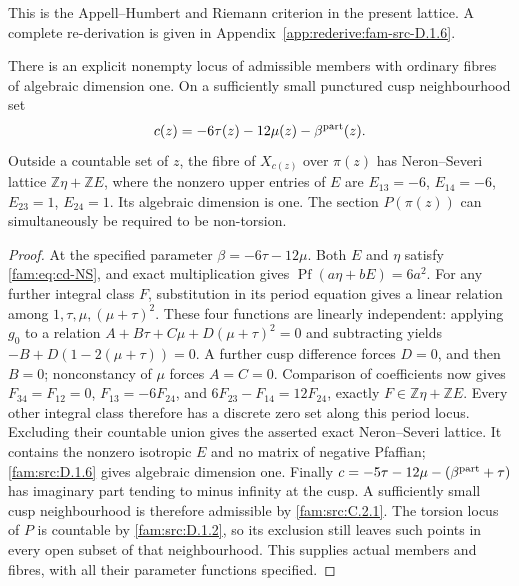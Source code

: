 This is the Appell--Humbert and Riemann criterion in the present lattice. A complete re-derivation is given in Appendix~\ref{app:rederive:fam-src-D.1.6}.


\begin{proposition}\label{fam:src:D.1.7}\label{fam:st:D.1.7}
There is an explicit nonempty locus of admissible members with ordinary
fibres of algebraic dimension one. On a sufficiently small punctured
cusp neighbourhood set
\[
 c(z)=-6\tau(z)-12\mu(z)-\beta^{\rm part}(z).
\]
Outside a countable set of $z$, the fibre of $X_{c(z)}$ over $\pi(z)$ has
Neron--Severi lattice $\mathbb Z\eta+\mathbb ZE$, where the nonzero upper
entries of $E$ are
$E_{13}=-6$, $E_{14}=-6$, $E_{23}=1$, $E_{24}=1$.
Its algebraic dimension is one. The section $P(\pi(z))$ can simultaneously
be required to be non-torsion.
\end{proposition}

\begin{proof}
At the specified parameter $\beta=-6\tau-12\mu$. Both $E$ and $\eta$
satisfy \eqref{fam:eq:cd-NS}, and exact multiplication gives
$\operatorname{Pf}(a\eta+bE)=6a^2$.
For any further integral class $F$, substitution in its period equation
gives a linear relation among $1,\tau,\mu,(\mu+\tau)^2$.
These four functions are linearly independent: applying $g_0$ to a
relation $A+B\tau+C\mu+D(\mu+\tau)^2=0$ and subtracting yields
$-B+D(1-2(\mu+\tau))=0$. A further cusp difference forces $D=0$,
and then $B=0$; nonconstancy of $\mu$ forces $A=C=0$.
Comparison of coefficients now gives
$F_{34}=F_{12}=0$, $F_{13}=-6F_{24}$, and
$6F_{23}-F_{14}=12F_{24}$, exactly
$F\in\mathbb Z\eta+\mathbb ZE$. Every other integral class therefore
has a discrete zero set along this period locus. Excluding their
countable union gives the asserted exact Neron--Severi lattice.
It contains the nonzero isotropic $E$ and no matrix of negative
Pfaffian; \ref{fam:src:D.1.6} gives algebraic dimension one.
Finally
$c=-5\tau-12\mu-(\beta^{\rm part}+\tau)$ has imaginary part tending
to minus infinity at the cusp. A sufficiently small cusp neighbourhood
is therefore admissible by \ref{fam:src:C.2.1}. The torsion locus of $P$ is countable
by \ref{fam:src:D.1.2}, so its exclusion still leaves such points in every open subset
of that neighbourhood. This supplies actual members and fibres, with
all their parameter functions specified.
\end{proof}


